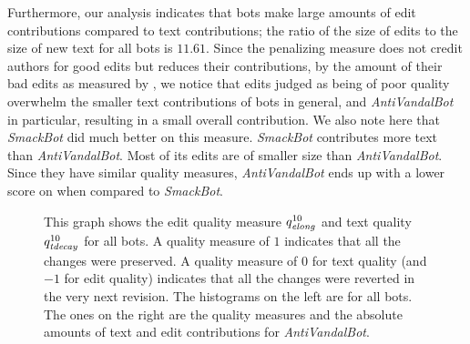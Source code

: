 Furthermore, our analysis indicates that bots make large amounts of
edit contributions compared to text contributions; the ratio
of the size of edits \editonly to the size of new text \textonly
for all bots is $11.61$.
Since the penalizing measure \punish does not credit authors for
good edits but reduces their \textlong contributions, by the 
amount of their bad edits as measured by \editlong, we notice that 
edits judged as being of poor quality overwhelm the smaller text 
contributions of bots in general, and \textit{AntiVandalBot} in particular, 
resulting in a small overall contribution.
We also note here that \textit{SmackBot} did much better on this
measure.
\textit{SmackBot} contributes more text than \textit{AntiVandalBot}.
Most of its edits are of smaller size than \textit{AntiVandalBot}.
Since they have similar quality measures, \textit{AntiVandalBot} ends
up with a lower score on \punish when compared to \textit{SmackBot}.

%
\begin{figure}[tbhp]
    \begin{center}
    \end{center}
    \caption[Measuring edit and text quality for all bots and \textit{AntiVandalBot}]{
    	This graph shows the edit quality measure $\quality{elong}{10}{}$
        and text quality $\quality{tdecay}{10}{}$ for all bots.
        A quality measure of $1$ indicates that all the changes
        were preserved.
        A quality measure of $0$ for text quality (and $-1$ for edit quality)
	indicates that all the changes
        were reverted in the very next revision.
        The histograms on the left are for all bots.
        The ones on the right are the quality measures and the absolute amounts
        of text and edit contributions for \textit{AntiVandalBot}.
    }
    \label{bot-contribs}
\end{figure}
